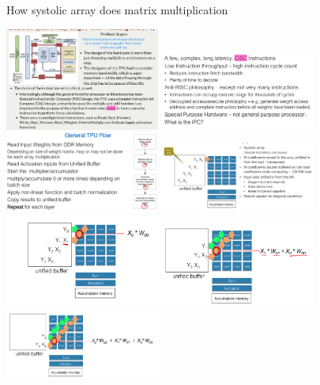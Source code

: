 \documentclass[letter,8pt,landscape]{article}
\begin{document}
\begin{multicols}{3}
  How systolic array does matrix multiplication
  \begin{center}
    \includegraphics[width=2in]{images/tpu-block.jpg}
    \includegraphics[width=2in]{images/tpu-inst.jpg}
    \includegraphics[width=2in]{images/tpu-flow.jpg}
    \includegraphics[width=2in]{images/tpu1.jpg}
    \includegraphics[width=2in]{images/tpu2.jpg}
    \includegraphics[width=2in]{images/tpu3.jpg}
    \includegraphics[width=2in]{images/tpu4.jpg}

\end{center}
\end{multicols}
\end{document}
